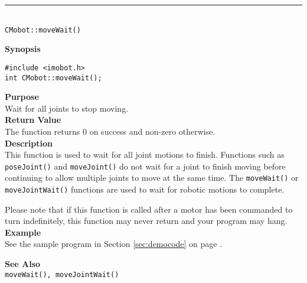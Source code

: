 \noindent
\vspace{5pt}
\rule{4.5in}{0.015in}\\
\noindent
{\LARGE \texttt{CMobot::moveWait()}}\\
{}

\noindent
{\bf Synopsis}\\
\begin{verbatim}
#include <imobot.h>
int CMobot::moveWait();
\end{verbatim}

\noindent
{\bf Purpose}\\
Wait for all joints to stop moving.\\

\noindent
{\bf Return Value}\\
The function returns 0 on success and non-zero otherwise.\\

\noindent
{\bf Description}\\
This function is used to wait for all joint motions to finish. Functions such as
\texttt{poseJoint()} and \texttt{moveJoint()} do not wait for a joint to finish
moving before continuing to allow multiple joints to move at the same time. The
\texttt{moveWait()} or \texttt{moveJointWait()} functions are used to wait for
robotic motions to complete.

Please note that if this function is called after a motor has been commanded to
turn indefinitely, this function may never return and your program may hang.\\

\noindent
{\bf Example}\\
See the sample program in Section \ref{sec:democode} on page \pageref{sec:democode}.
\noindent

\noindent
{\bf See Also}\\
\texttt{moveWait(), moveJointWait()}

